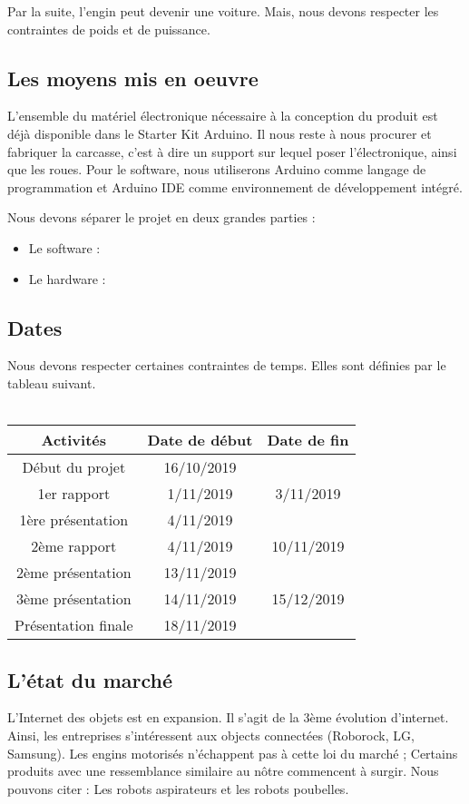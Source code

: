 \documentclass[conference]{IEEEtran}
\begin{document}
Par la suite, l'engin peut devenir une voiture. Mais, nous devons respecter les contraintes de poids et de puissance.
\subsection{Les moyens mis en oeuvre}
L'ensemble du matériel électronique nécessaire à la conception du produit est déjà disponible dans le Starter Kit Arduino. Il nous reste à nous procurer et fabriquer la carcasse, c'est à dire un support sur lequel poser l'électronique, ainsi que les roues. Pour le software, nous utiliserons Arduino comme langage de programmation et Arduino IDE comme environnement de développement intégré.

Nous devons séparer le projet en deux grandes parties :
\begin{itemize}
    \item Le software :
    \item Le hardware :
\end{itemize}


\subsection{Dates}
Nous devons respecter certaines contraintes de temps. Elles sont définies par le tableau suivant.
\\ \\
\begin{tabular}{|*{3}{c|}}
  \hline
  Activités & Date de début & Date de fin \\
  \hline
  Début du projet & 16/10/2019 &  \\
  1er rapport & 1/11/2019 & 3/11/2019 \\
  1ère présentation & 4/11/2019 &   \\
  2ème rapport & 4/11/2019 & 10/11/2019  \\
  2ème présentation & 13/11/2019 &   \\
  3ème présentation & 14/11/2019 & 15/12/2019  \\
  Présentation finale & 18/11/2019 &  \\
  \hline
\end{tabular}

\subsection{L'état du marché}
L'Internet des objets est en expansion. Il s'agit de la 3ème évolution d'internet. Ainsi, les entreprises s'intéressent aux objects connectées (Roborock, LG, Samsung). Les engins motorisés n'échappent pas à cette loi du marché ; Certains produits avec une ressemblance similaire au nôtre commencent à surgir. Nous pouvons citer : Les robots aspirateurs et les robots poubelles. 
\end{document}
